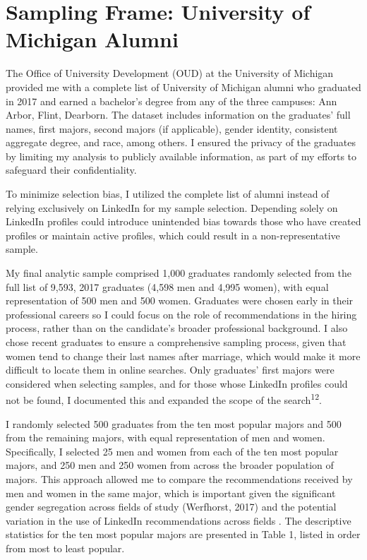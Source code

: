 \documentclass[12pt]{caltech_thesis}
\begin{document}
\section{Sampling Frame: University of Michigan Alumni}
The Office of University Development (OUD) at the University of Michigan provided me with a complete list of University of Michigan alumni who graduated in 2017 and earned a bachelor’s degree from any of the three campuses: Ann Arbor, Flint, Dearborn. The dataset includes information on the graduates’ full names, first majors, second majors (if applicable), gender identity, consistent aggregate degree, and race, among others. I ensured the privacy of the graduates by limiting my analysis to publicly available information, as part of my efforts to safeguard their confidentiality.

To minimize selection bias, I utilized the complete list of alumni instead of relying exclusively on LinkedIn for my sample selection. Depending solely on LinkedIn profiles could introduce unintended bias towards those who have created profiles or maintain active profiles, which could result in a non-representative sample. 

My final analytic sample comprised 1,000 graduates randomly selected from the full list of 9,593, 2017 graduates (4,598 men and 4,995 women), with equal representation of 500 men and 500 women. Graduates were chosen early in their professional careers so I could focus on the role of recommendations in the hiring process, rather than on the candidate’s broader professional background. I also chose recent graduates to ensure a comprehensive sampling process, given that women tend to change their last names after marriage, which would make it more difficult to locate them in online searches. Only graduates’ first majors were considered when selecting samples, and for those whose LinkedIn profiles could not be found, I documented this and expanded the scope of the search\textsuperscript{12}.

I randomly selected 500 graduates from the ten most popular majors and 500 from the remaining majors, with equal representation of men and women. Specifically, I selected 25 men and women from each of the ten most popular majors, and 250 men and 250 women from across the broader population of majors. This approach allowed me to compare the recommendations received by men and women in the same major, which is important given the significant gender segregation across fields of study (Werfhorst, 2017) and the potential variation in the use of LinkedIn recommendations across fields . The descriptive statistics for the ten most popular majors are presented in Table 1, listed in order from most to least popular.
\end{document}
